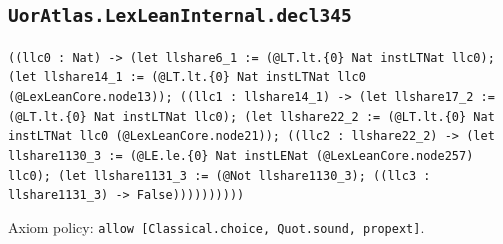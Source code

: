 \documentclass[11pt]{article}
\begin{document}
\subsection*{\texttt{UorAtlas.LexLeanInternal.decl345}}
\noindent\texttt{((llc0 : Nat) -> (let llshare6\_1 := (@LT.lt.\{0\} Nat instLTNat llc0); (let llshare14\_1 := (@LT.lt.\{0\} Nat instLTNat llc0 (@LexLeanCore.node13)); ((llc1 : llshare14\_1) -> (let llshare17\_2 := (@LT.lt.\{0\} Nat instLTNat llc0); (let llshare22\_2 := (@LT.lt.\{0\} Nat instLTNat llc0 (@LexLeanCore.node21)); ((llc2 : llshare22\_2) -> (let llshare1130\_3 := (@LE.le.\{0\} Nat instLENat (@LexLeanCore.node257) llc0); (let llshare1131\_3 := (@Not llshare1130\_3); ((llc3 : llshare1131\_3) -> False))))))))))}\par
\noindent Axiom policy: \texttt{allow [Classical.choice, Quot.sound, propext]}.\par
\end{document}
